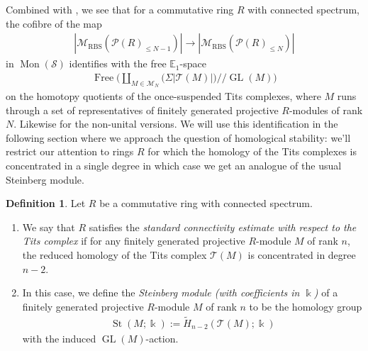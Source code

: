 \documentclass[12pt, reqno]{amsart}
\theoremstyle{plain}
\theoremstyle{definition}
\newtheorem{definition}[theorem]{Definition}
\begin{document}
Combined with , we see that for a commutative ring $R$ with connected spectrum, the cofibre of the map
\begin{align*}
|\mathscr{M}_{\operatorname{RBS}}(\mathcal{P}(R)_{\leq N-1})|\longrightarrow |\mathscr{M}_{\operatorname{RBS}}(\mathcal{P}(R)_{\leq N})|
\end{align*}
in $\operatorname{Mon}(\mathcal{S})$ identifies with the free $\mathbb{E}_1$-space
\begin{align*}
\operatorname{Free}\bigg(\coprod_{M\in \mathcal{M}_N}\big(\Sigma|\mathcal{T}(M)| \big)/\!\!/\operatorname{GL}(M)\bigg)
\end{align*}
on the homotopy quotients of the once-suspended Tits complexes, where $M$ runs through a set of representatives of finitely generated projective $R$-modules of rank $N$. Likewise for the non-unital versions. We will use this identification in the following section where we approach the question of homological stability: we'll restrict our attention to rings $R$ for which the homology of the Tits complexes is concentrated in a single degree in which case we get an analogue of the usual Steinberg module.

\begin{definition}\label{standard connectivity estimate}
Let $R$ be a commutative ring with connected spectrum. 
\begin{enumerate}
\item  We say that $R$ satisfies the \textit{standard connectivity estimate with respect to the Tits complex} if for any finitely generated projective $R$-module $M$ of rank $n$, the reduced homology of the Tits complex $\mathcal{T}(M)$ is concentrated in degree $n-2$.
\item In this case, we define the \textit{Steinberg module (with coefficients in $\Bbbk$)} of a finitely generated projective $R$-module $M$ of rank $n$ to be the homology group
\begin{align*}
\operatorname{St}(M;\Bbbk):=\tilde{H}_{n-2}(\mathcal{T}(M); \Bbbk)
\end{align*}
with the induced $\operatorname{GL}(M)$-action.\qedhere
\end{enumerate}
\end{definition}
\end{document}
